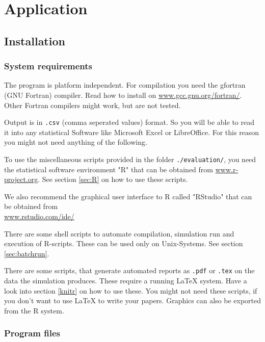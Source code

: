 \section{Application }

\subsection{Installation}


\subsubsection{System requirements}

The program is platform independent. For compilation you need the gfortran (GNU Fortran) compiler. Read how to install on \href{http://gcc.gnu.org/fortran/}{www.gcc.gnu.org/fortran/}. Other Fortran compilers might work, but are not tested.

Output is in \texttt{.csv} (comma seperated values) format. So you will be able to read it into any statistical Software like Microsoft Excel or LibreOffice. For this reason you might not need anything of the following.

To use the miscellaneous scripts provided in the folder \texttt{./evaluation/}, you need the statistical software environment "R" that can be obtained from \href{http://www.r-project.org/}{www.r-project.org}. See section \ref{sec:R} on how to use these scripts.

We also recommend the graphical user interface to R called "RStudio" that can be obtained from \\ \href{http://www.rstudio.com/ide/}{www.rstudio.com/ide/}

There are some shell scripts to automate compilation, simulation run and execution of R-scripts. These can be used only on Unix-Systems. See section \ref{sec:batchrun}.

There are some scripts, that generate automated reports as \texttt{.pdf} or \texttt{.tex} on the data the simulation produces. These require a running LaTeX system. Have a look into section \ref{knitr} on how to use these. You might not need these scripts, if you don't want to use LaTeX to write your papers. Graphics can also be exported from the R system.

\subsubsection{Program files}

